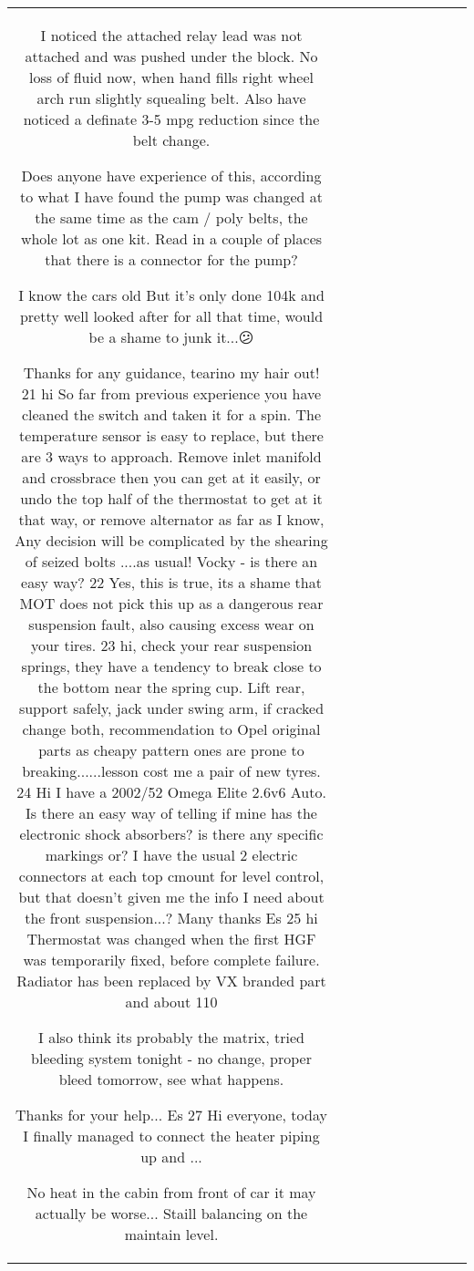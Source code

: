 \begin{table}[h!]
\begin{tabular}{|c|c|c|c|c|c|c|c|c|c|}
{I noticed the attached relay lead was not attached and was pushed under the block. No loss of fluid now, when hand fills right wheel arch run slightly squealing belt. Also have noticed a definate 3-5 mpg reduction since the belt change.

Does anyone have experience of this, according to what I have found the pump was changed at the same time as the cam / poly belts, the whole lot as one kit. Read in a couple of places that there is a connector for the pump?

I know the cars old But it's only done 104k and pretty well looked after for all that time, would be a shame to junk it...😕

Thanks for any guidance, tearino my hair out!
21
hi
So far from previous experience you have cleaned the switch and taken it for a spin. The temperature sensor is easy to replace, but there are 3 ways to approach. Remove inlet manifold and crossbrace then you can get at it easily, or undo the top half of the thermostat to get at it that way, or remove alternator as far as I know, Any decision will be complicated by the shearing of seized bolts ....as usual!
Vocky - is there an easy way?
22
Yes, this is true, its a shame that MOT does not pick this up as a dangerous rear suspension fault, also causing excess wear on your tires.
23
hi,
check your rear suspension springs, they have a tendency to break close to the bottom near the spring cup. Lift rear, support safely, jack under swing arm, if cracked change both, recommendation to Opel original parts as cheapy pattern ones are prone to breaking......lesson cost me a pair of new tyres. 
24
Hi
I have a 2002/52 Omega Elite 2.6v6 Auto. Is there an easy way of telling if mine has the electronic shock absorbers? is there any specific markings or? I have the usual 2 electric connectors at each top cmount for level control, but that doesn't given me the info I need about the front suspension...?
Many thanks
Es
25
hi
Thermostat was changed when the first HGF was temporarily fixed, before complete failure. Radiator has been replaced by VX branded part and about 110%

I also think its probably the matrix, tried bleeding system tonight - no change, proper bleed tomorrow, see what happens.

Thanks for your help...
Es
27
Hi everyone, today I finally managed to connect the heater piping up and ...

No heat in the cabin from front of car it may actually be worse... Staill balancing on the maintain level.

}
\end{tabular}
\end{table}
